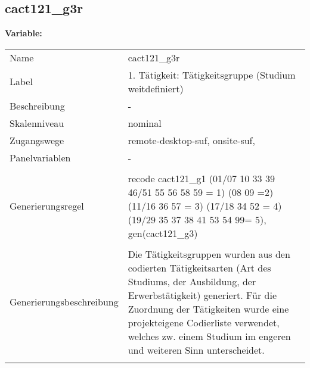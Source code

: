 	
	
	\subsection{cact121\_g3r}
	\label{subSection:cact121_g3r}

	\noindent\textbf{Variable:}\\
		\begin{tabular}{lL{11.3cm}}
			\label{tableVariable:cact121_g3r}
			Name & cact121\_g3r \\
			Label & 1. Tätigkeit: Tätigkeitsgruppe (Studium weitdefiniert) \\
			Beschreibung & - \\
			Skalenniveau & nominal \\
			Zugangswege &
				remote-desktop-suf,
				onsite-suf,
 \\
			Panelvariablen & -
			 \\
			 \\
					Generierungsregel & recode cact121\_g1  (01/07 10 33 39 46/51 55 56 58 59 = 1) (08 09 =2) (11/16 36 57 = 3) (17/18 34 52 = 4) (19/29 35 37 38 41 53 54 99= 5), gen(cact121\_g3) \\
				 \\
					Generierungsbeschreibung & Die Tätigkeitsgruppen wurden aus den codierten Tätigkeitsarten (Art des Studiums, der Ausbildung, der Erwerbstätigkeit) generiert. Für die Zuordnung der Tätigkeiten wurde eine projekteigene Codierliste verwendet, welches zw. einem Studium im engeren und weiteren Sinn unterscheidet.
				 \\	
			 \\
		\end{tabular}






